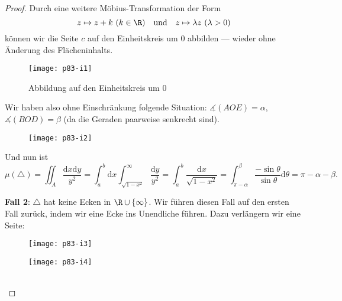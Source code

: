 \begin{remark}
\begin{enumerate}
\begin{proof}
      Durch eine weitere Möbius-Transformation der Form
      \begin{equation*}
        z \mapsto z + k \ (k \in \R) \quad \text{und} \quad z \mapsto \lambda z \ (\lambda > 0)
      \end{equation*}
      können wir die Seite \( c \) auf den Einheitskreis um \( 0 \) abbilden --- wieder ohne Änderung des Flächeninhalts.

      \begin{figure}[H]
        \texttt{[image: p83-i1]}
        \caption{Abbildung auf den Einheitskreis um \( 0 \)}
      \end{figure}

      \begin{minipage}{.475\textwidth}
        Wir haben also ohne Einschränkung folgende Situation: \( \measuredangle(AOE) = \alpha \), \( \measuredangle(BOD) = \beta \) (da die Geraden paarweise senkrecht sind).
      \end{minipage}
      \hfill
      \begin{minipage}{.475\textwidth}
        \begin{figure}[H]
          \texttt{[image: p83-i2]}
        \end{figure}
      \end{minipage}

      Und nun ist
      \begin{equation*}
        \mu(\triangle) = \iint_A \frac{\text{d}x\text{d}y}{y^2} = \int_a^b \text{d}x \int_{\sqrt{1-x^2}}^\infty \frac{\text{d}y}{y^2} = \int_a^b \frac{\text{d}x}{\sqrt{1-x^2}} = \int_{\pi - \alpha}^\beta \frac{-\sin \theta}{\sin \theta}\text{d}\theta = \pi - \alpha - \beta\text{.}
      \end{equation*}

      \textbf{Fall 2}: \( \triangle \) hat keine Ecken in \( \R \cup \left \{ \infty \right \} \). Wir führen diesen Fall auf den ersten Fall zurück, indem wir eine Ecke ins Unendliche führen. Dazu verlängern wir eine Seite:

      \begin{minipage}{.475\textwidth}
        \begin{figure}[H]
          \texttt{[image: p83-i3]}
        \end{figure}
      \end{minipage}
      \hfill
      \begin{minipage}{.475\textwidth}
        \begin{figure}[H]
          \texttt{[image: p83-i4]}
        \end{figure}
      \end{minipage}
      \ \\


\end{proof}
\end{enumerate}
\end{remark}
